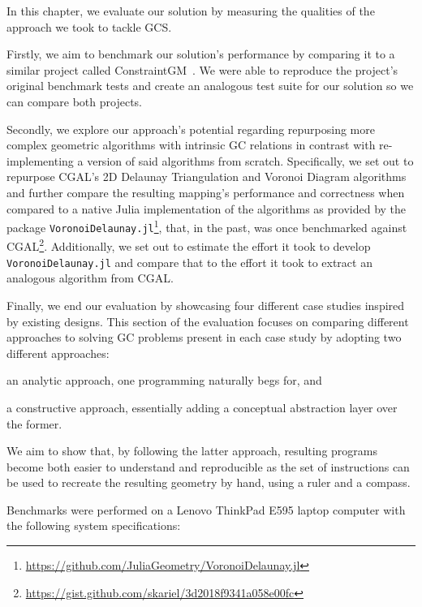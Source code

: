 %
\label{chap:eval}
\cleardoublepage{}

\noindent In this chapter, we evaluate our solution by measuring the qualities
of the approach we took to tackle \ac{GCS}.

Firstly, we aim to benchmark our solution's performance by comparing it to a
similar project called ConstraintGM~\cite{Pinheiro:2016:MGR}.  We were able to
reproduce the project's original benchmark tests and create an analogous test
suite for our solution so we can compare both projects.

Secondly, we explore our approach's potential regarding repurposing more complex
geometric algorithms with intrinsic \ac{GC} relations in contrast with
re-implementing a version of said algorithms from scratch.  Specifically, we set
out to repurpose \ac{CGAL}'s 2D Delaunay Triangulation and Voronoi Diagram
algorithms and further compare the resulting mapping's performance and
correctness when compared to a native Julia implementation of the algorithms as
provided by the package
\texttt{VoronoiDelaunay.jl}\footnote{\url{https://github.com/JuliaGeometry/VoronoiDelaunay.jl}},
that, in the past, was once benchmarked against
\ac{CGAL}\footnote{\url{https://gist.github.com/skariel/3d2018f9341a058e00fc}}.
Additionally, we set out to estimate the effort it took to develop
\texttt{VoronoiDelaunay.jl} and compare that to the effort it took to extract an
analogous algorithm from \ac{CGAL}.

Finally, we end our evaluation by showcasing four different case studies
inspired by existing designs.  This section of the evaluation focuses on
comparing different approaches to solving \ac{GC} problems present in each case
study by adopting two different approaches: 
\begin{enumerate*}[label= (\arabic*)]
  \item an analytic approach, one programming naturally begs for, and 
  \item a constructive approach, essentially adding a conceptual abstraction
  layer over the former.
\end{enumerate*}
We aim to show that, by following the latter approach, resulting programs become
both easier to understand and reproducible as the set of instructions can be
used to recreate the resulting geometry by hand, using a ruler and a compass.

Benchmarks were performed on a Lenovo{\textregistered}
ThinkPad{\textregistered} E595 laptop computer with the following
system specifications:

